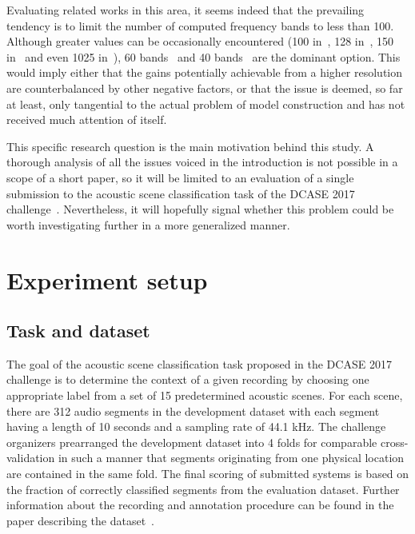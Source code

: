 \documentclass{article}
\begin{document}
\begin{sloppy}
Evaluating related works in this area, it seems indeed that the prevailing tendency is to limit the number of computed frequency bands to less than 100. Although greater values can be occasionally encountered (100 in~\cite{hayashi2016}, 128 in~\cite{salamon2017}, 150 in~\cite{giannoulis2016} and even 1025 in~\cite{zoehrer2016}), 60 bands~\cite{valenti2016,battaglino2016} and 40 bands~\cite{xu2016,bae2016,adavanne2016, sobieraj2016} are the dominant option. This would imply either that the gains potentially achievable from a higher resolution are counterbalanced by other negative factors, or that the issue is deemed, so far at least, only tangential to the actual problem of model construction and has not received much attention of itself.

This specific research question is the main motivation behind this study. A thorough analysis of all the issues voiced in the introduction is not possible in a scope of a short paper, so it will be limited to an evaluation of a single submission to the acoustic scene classification task of the DCASE 2017 challenge~\cite{DCASE2017challenge}. Nevertheless, it will hopefully signal whether this problem could be worth investigating further in a more generalized manner.

\vspace{-2pt}

\section{Experiment setup}

\subsection{Task and dataset}

The goal of the acoustic scene classification task proposed in the DCASE 2017 challenge is to determine the context of a given recording by choosing one appropriate label from a set of 15 predetermined acoustic scenes. For each scene, there are 312 audio segments in the development dataset with each segment having a length of 10 seconds and a sampling rate of 44.1 kHz. The challenge organizers prearranged the development dataset into 4 folds for comparable cross-validation in such a manner that segments originating from one physical location are contained in the same fold. The final scoring of submitted systems is based on the fraction of correctly classified segments from the evaluation dataset. Further information about the recording and annotation procedure can be found in the paper describing the dataset~\cite{mesaros2016}.


\end{sloppy}
\end{document}

